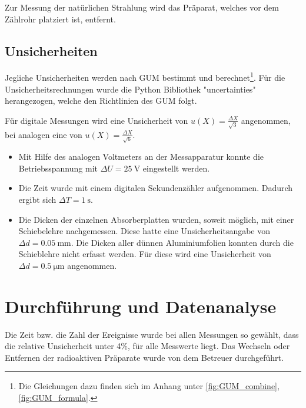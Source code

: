 		Zur Messung der natürlichen Strahlung wird das Präparat, welches vor dem Zählrohr platziert ist, entfernt.
				
	\subsection{Unsicherheiten}
	
		Jegliche Unsicherheiten werden nach GUM bestimmt und berechnet\footnote{Die Gleichungen dazu finden sich im Anhang unter \ref{fig:GUM_combine}, \ref{fig:GUM_formula}.}.
		Für die Unsicherheitsrechnungen wurde die Python Bibliothek "uncertainties" herangezogen, welche den Richtlinien des GUM folgt.
	
		Für digitale Messungen wird eine Unsicherheit von $u(X) = \frac{\Delta X}{\sqrt{3}}$ angenommen, bei analogen eine von $u(X) = \frac{\Delta X}{\sqrt{6}}$.
		
		\begin{itemize}
			\item Mit Hilfe des analogen Voltmeters an der Messapparatur konnte die Betriebsspannung mit $\Delta U = \SI{25}{\volt}$ eingestellt werden.
			
			\item Die Zeit wurde mit einem digitalen Sekundenzähler aufgenommen.
			Dadurch ergibt sich $\Delta T = \SI{1}{\second}$.
			
			\item Die Dicken der einzelnen Absorberplatten wurden, soweit möglich, mit einer Schiebelehre nachgemessen.
			Diese hatte eine Unsicherheitsangabe von $\Delta d = \SI{0.05}{\milli\meter}$.
			Die Dicken aller dünnen Aluminiumfolien konnten durch die Schieblehre nicht erfasst werden.
			Für diese wird eine Unsicherheit von $\Delta d = \SI{0.5}{\micro\meter}$ angenommen.
		\end{itemize}
		
\section{Durchführung und Datenanalyse}
		
	Die Zeit bzw. die Zahl der Ereignisse wurde bei allen Messungen so gewählt, dass die relative Unsicherheit unter 4\%, für alle Messwerte liegt.
	Das Wechseln oder Entfernen der radioaktiven Präparate wurde von dem Betreuer durchgeführt.
	

